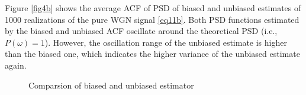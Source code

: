 \documentclass[10pt]{article}
\begin{document}
Figure \ref{fig4b} shows the average ACF of PSD of biased and unbiased estimates 
of 1000 realizations of the pure WGN signal \eqref{eq11b}. Both PSD 
functions estimated by the biased and unbiased ACF oscillate around the 
theoretical PSD (i.e., $P\left(\omega\right)=1$). However, 
the oscillation range of the unbiased estimate is higher than the 
biased one, which indicates the higher variance of the unbiased 
estimate again.

\begin{figure}[htbp]
    \centering
    \caption{Comparsion of biased and unbiased estimator}
    \label{fig4}
\end{figure}
\end{document}
